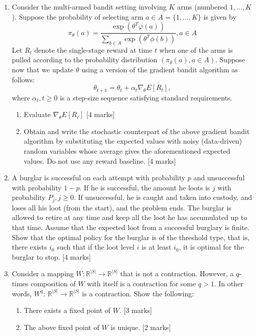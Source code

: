 \documentclass[12pt]{article}
\begin{document}
\begin{enumerate}
  \item
        Consider the multi-armed bandit setting involving \( K \) arms (numbered \( 1, \dots, K \)).
        Suppose the probability of selecting arm \( a \in A=\{1, \dots, K\} \) is given by
        \[
          \pi_{\theta}(a)=\frac{\exp \left(\theta^{T} \varphi(a)\right)}{\sum_{b \in A} \exp \left(\theta^{T} \phi(b)\right)}, a \in A
        \]
        Let \( R_{t} \) denote the single-stage reward at time \( t \) when one of the arms is pulled according to the probability distribution \( \left(\pi_{\theta}(a), a \in A\right) \).
        Suppose now that we update \( \theta \) using a version of the gradient bandit algorithm as follows:
        \[
          \theta_{t+1}=\theta_{t}+\alpha_{t} \nabla_{\theta} E\left[R_{t}\right],
        \]
        where \( \alpha_{t}, t \geq 0 \) is a step-size sequence satisfying standard requirements.
        \begin{enumerate}
          \item
                Evaluate \( \nabla_{\theta} E\left[R_{\ell}\right] \)
                \hfill [4 marks]
          \item
                Obtain and write the stochastic counterpart of the above gradient bandit algorithm by substituting the expected values with noisy (data-driven) random variables whose average gives the aforementioned expected values.
                Do not use any reward baseline.
                \hfill [4 marks]
        \end{enumerate}

  \item
        A burglar is successful on each attempt with probability \( p \) and unsuccessful with probability \( 1-p \).
        If he is successful, the amount he loots is \( j \) with probability \( P_{j}, j \geq 0 \).
        If unsuccessful, he is caught and taken into custody, and loses all his loot (from the start), and the problem ends.
        The burglar is allowed to retire at any time and keep all the loot he has accumulated up to that time.
        Assume that the expected loot from a successful burglary is finite.
        Show that the optimal policy for the burglar is of the threshold type, that is, there exists \( i_{0} \) such that if the loot level \( i \) is at least \( i_{0} \), it is optimal for the burglar to stop.
        \hfill [4 marks]

  \item
        Consider a mapping \( W: \mathbb{R}^{|S|} \rightarrow \mathbb{R}^{|S|} \) that is not a contraction.
        However, a \( q \)-times composition of \( W \) with itself is a contraction for some \( q>1 \).
        In other words, \( W^{q} \): \( \mathbb{R}^{|S|} \rightarrow \mathbb{R}^{|S|} \) is a contraction.
        Show the following:
        \begin{enumerate}
          \item
                There exists a fixed point of \( W \).
                \hfill [3 marks]

          \item
                The above fixed point of \( W \) is unique.
                \hfill [2 marks]
        \end{enumerate}

\end{enumerate}
\end{document}
